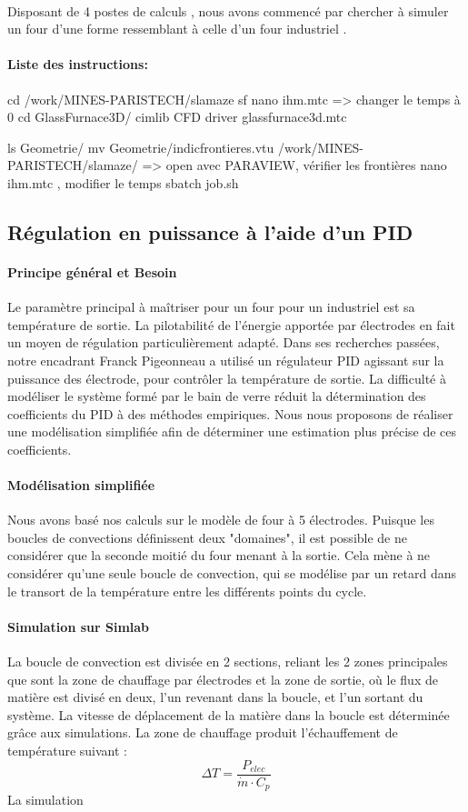 \documentclass[12pt, a4paper, french, BCOR = 0pt, DIV = 10]{scrartcl}
\begin{document}
	\paragraph{}
	 Disposant de 4 postes de calculs , nous avons commencé par chercher à simuler un four  d'une forme ressemblant à celle d'un four industriel .
	 
	 \paragraph{Liste des instructions:}
	 cd /work/MINES-PARISTECH/slamaze
	 sf
	 nano ihm.mtc => changer le temps à 0
	 cd GlassFurnace3D/
	 cimlib CFD driver glassfurnace3d.mtc
	 
	 ls Geometrie/
	 mv Geometrie/indicfrontieres.vtu /work/MINES-PARISTECH/slamaze/ => open avec PARAVIEW, vérifier les frontières
	 nano ihm.mtc , modifier le temps
	 sbatch job.sh

     \subsection{Régulation en puissance à l'aide d'un PID}
     \paragraph{Principe général et Besoin}
     Le paramètre principal à maîtriser pour un four pour un industriel est sa température de sortie. La pilotabilité de l'énergie apportée par électrodes en fait un moyen de régulation particulièrement adapté. Dans ses recherches passées, notre encadrant Franck Pigeonneau a utilisé un régulateur PID agissant sur la puissance des électrode, pour contrôler la température de sortie. La difficulté à modéliser le système formé par le bain de verre réduit la détermination des coefficients du PID à des méthodes empiriques. Nous nous proposons de réaliser une modélisation simplifiée afin de déterminer une estimation plus précise de ces coefficients.

     \paragraph{Modélisation simplifiée}
     Nous avons basé nos calculs sur le modèle de four à 5 électrodes. Puisque les boucles de convections définissent deux "domaines", il est possible de ne considérer que la seconde moitié du four menant à la sortie. Cela mène à ne considérer qu'une seule boucle de convection, qui se modélise par un retard dans le transort de la température entre les différents points du cycle.

     \paragraph{Simulation sur Simlab}
     La boucle de convection est divisée en 2 sections, reliant les 2 zones principales que sont la zone de chauffage par électrodes et la zone de sortie, où le flux de matière est divisé en deux, l'un revenant dans la boucle, et l'un sortant du système. La vitesse de déplacement de la matière dans la boucle est déterminée grâce aux simulations. La zone de chauffage produit l'échauffement de température suivant :
     $$\Delta T = \frac{P_{elec}}{\dot{m}\cdot C_p}$$
     La simulation 
	
\end{document}
